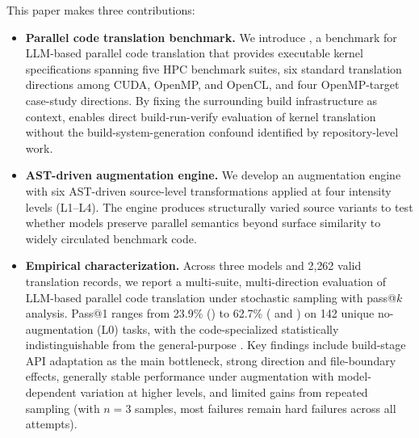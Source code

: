 This paper makes three contributions:

\begin{itemize}%
\item \textbf{Parallel code translation benchmark.} We introduce \textsc{\parbench{}}, a benchmark for LLM-based parallel code translation that provides executable kernel specifications spanning five HPC benchmark suites, six standard translation directions among CUDA, OpenMP, and OpenCL, and four OpenMP-target case-study directions. By fixing the surrounding build infrastructure as context, \textsc{\parbench{}} enables direct build-run-verify evaluation of kernel translation without the build-system-generation confound identified by repository-level work.

\item \textbf{AST-driven augmentation engine.} We develop an augmentation engine with six AST-driven source-level transformations applied at four intensity levels (L1--L4). The engine produces structurally varied source variants %
to test whether models preserve parallel semantics beyond surface similarity to widely circulated benchmark code.

\item \textbf{Empirical characterization.} Across three models and 2{,}262 valid translation records, we report a multi-suite, multi-direction evaluation of LLM-based parallel code translation under stochastic sampling with pass@$k$ analysis. Pass@1 ranges from 23.9\% (\qwenshort{}) to 62.7\% (\gptnew{} and \codex{}) on 142 unique no-augmentation (L0) tasks, with the code-specialized \codex{} statistically indistinguishable from the general-purpose \gptnew{}. Key findings include build-stage API adaptation as the main bottleneck, strong direction and file-boundary effects, generally stable performance under augmentation with model-dependent variation at higher levels, and limited gains from repeated sampling (with $n{=}3$ samples, most failures remain hard failures across all attempts).
\end{itemize}


